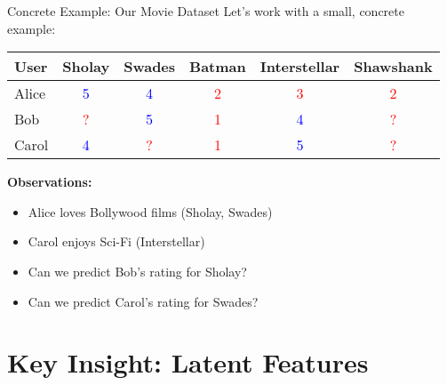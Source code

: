 \documentclass{beamer}
\begin{document}
\begin{frame}{Concrete Example: Our Movie Dataset}
Let's work with a small, concrete example:

\pause
\begin{center}
\renewcommand{\arraystretch}{1.2}
\begin{tabular}{l|ccccc}
\toprule
\textbf{User} & \textbf{Sholay} & \textbf{Swades} & \textbf{Batman} & \textbf{Interstellar} & \textbf{Shawshank} \\
\midrule
Alice & \textcolor{blue}{5} & \textcolor{blue}{4} & \textcolor{red}{2} & \textcolor{red}{3} & \textcolor{red}{2} \\
Bob & \textcolor{red}{?} & \textcolor{blue}{5} & \textcolor{red}{1} & \textcolor{blue}{4} & \textcolor{red}{?} \\
Carol & \textcolor{blue}{4} & \textcolor{red}{?} & \textcolor{red}{1} & \textcolor{blue}{5} & \textcolor{red}{?} \\
\bottomrule
\end{tabular}
\end{center}

\pause
\textbf{Observations:}
\begin{itemize}[<+->]
    \item Alice loves Bollywood films (Sholay, Swades)
    \item Carol enjoys Sci-Fi (Interstellar)  
    \item Can we predict Bob's rating for Sholay?
    \item Can we predict Carol's rating for Swades?
\end{itemize}
\end{frame}

\section{Key Insight: Latent Features}
\end{document}

